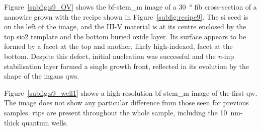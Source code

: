 Figure~\ref{subfig:s9_OV} shows the \acs{bf}-\acs{stem_m} image of a \qty{30}{\degree} \acs{fib} cross-section of a nanowire grown with the recipe shown in Figure~\ref{subfig:recipe9}. The \acl{si} seed is on the left of the image, and the III-V material is at its centre enclosed by the top \acs{sio2} template and the bottom buried oxide layer. Its surface appears to be formed by a  facet at the top and another, likely high-indexed, facet at the bottom. Despite this defect, initial nucleation was successful and the \textit{n}-\acs{inp} stabilisation layer formed a single  growth front, reflected in its evolution by the shape of the \acs{ingaas} \acl{qw}s.

Figure~\ref{subfig:s9_well1} shows a high-resolution \acs{bf}-\acs{stem_m} image of the first \acl{qw}. The image does not show any particular difference from those seen for previous samples. \Acl{rtp}s are present throughout the whole sample, including the \qty{10}{\nano\metre}-thick quantum wells.

